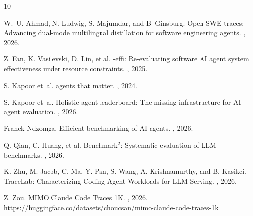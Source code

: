 \documentclass{article}
\begin{document}

\setlength{\bibsep}{1pt}
\setlength{\multicolsep}{3pt}
\small
\begin{thebibliography}{10}

W.~U. Ahmad, N. Ludwig, S. Majumdar, and B. Ginsburg.
\newblock Open-{SWE}-traces: Advancing dual-mode multilingual distillation for software engineering agents.
, 2026.

Z. Fan, K. Vasilevski, D. Lin, et al.
-effi: Re-evaluating software {AI} agent system effectiveness under resource constraints.
, 2025.

S. Kapoor et~al.
 agents that matter.
, 2024.

S. Kapoor et~al.
\newblock Holistic agent leaderboard: The missing infrastructure for {AI} agent evaluation.
, 2026.

Franck Ndzomga.
\newblock Efficient benchmarking of {AI} agents.
, 2026.

Q. Qian, C. Huang, et al.
\newblock Benchmark$^2$: Systematic evaluation of {LLM} benchmarks.
, 2026.


K. Zhu, M. Jacob, C. Ma, Y. Pan, S. Wang, A. Krishnamurthy, and B. Kasikci.
\newblock TraceLab: Characterizing Coding Agent Workloads for LLM Serving.
, 2026.

Z. Zou.
\newblock MIMO Claude Code Traces 1K.
, 2026.
\newblock \url{https://huggingface.co/datasets/choucsan/mimo-claude-code-traces-1k}

\end{thebibliography}


\normalsize

\newpage

\end{document}
